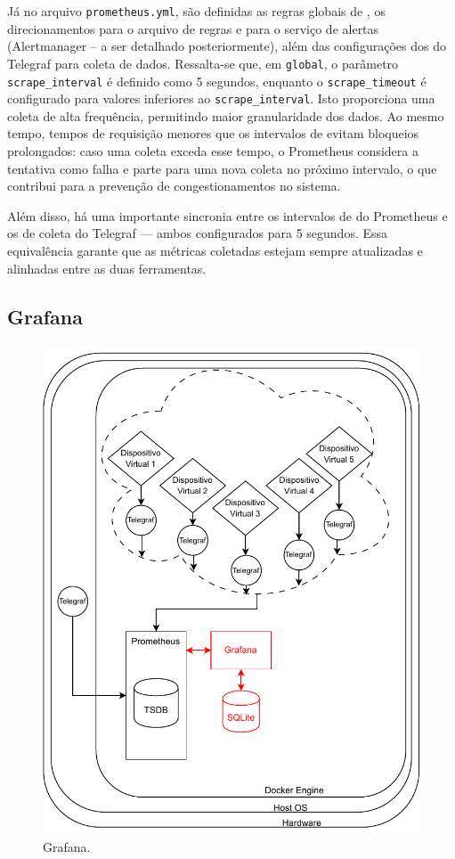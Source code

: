 Já no arquivo \verb|prometheus.yml|, são definidas as regras globais de , os direcionamentos para o arquivo de regras e para o serviço de alertas (Alertmanager -- a ser detalhado posteriormente), além das configurações dos  do Telegraf para coleta de dados. Ressalta-se que, em \verb|global|, o parâmetro \verb|scrape_interval| é definido como 5 segundos, enquanto o \verb|scrape_timeout| é configurado para valores inferiores ao \verb|scrape_interval|. Isto proporciona uma coleta de alta frequência, permitindo maior granularidade dos dados. Ao mesmo tempo, tempos de requisição menores que os intervalos de  evitam bloqueios prolongados: caso uma coleta exceda esse tempo, o Prometheus considera a tentativa como falha e parte para uma nova coleta no próximo intervalo, o que contribui para a prevenção de congestionamentos no sistema.

Além disso, há uma importante sincronia entre os intervalos de  do Prometheus e os de coleta do Telegraf --- ambos configurados para 5 segundos. Essa equivalência garante que as métricas coletadas estejam sempre atualizadas e alinhadas entre as duas ferramentas.

\subsection{Grafana}
\label{subsection:GrafanaVisualizacao}

\begin{figure}[H]
\centering
\includegraphics[scale=1]{Imagens/chap03/by-blocks/grafana_diagram.pdf}
\caption{Grafana.}
\label{fig:DiagramaGrafana}
\end{figure}

